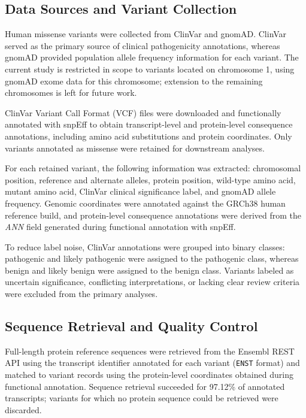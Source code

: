 \documentclass[12pt]{article}
\begin{document}
\subsection{Data Sources and Variant Collection}

Human missense variants were collected from ClinVar and gnomAD. ClinVar served as the primary source of clinical pathogenicity annotations, whereas gnomAD provided population allele frequency information for each variant. The current study is restricted in scope to variants located on chromosome 1, using gnomAD exome data for this chromosome; extension to the remaining chromosomes is left for future work.

ClinVar Variant Call Format (VCF) files were downloaded and functionally annotated with snpEff \cite{snpEff} to obtain transcript-level and protein-level consequence annotations, including amino acid substitutions and protein coordinates. Only variants annotated as missense were retained for downstream analyses.

For each retained variant, the following information was extracted: chromosomal position, reference and alternate alleles, protein position, wild-type amino acid, mutant amino acid, ClinVar clinical significance label, and gnomAD allele frequency. Genomic coordinates were annotated against the GRCh38 \cite{grch38} human reference build, and protein-level consequence annotations were derived from the \textit{ANN} field generated during functional annotation with snpEff.

To reduce label noise, ClinVar annotations were grouped into binary classes: pathogenic and likely pathogenic were assigned to the pathogenic class, whereas benign and likely benign were assigned to the benign class. Variants labeled as uncertain significance, conflicting interpretations, or lacking clear review criteria were excluded from the primary analyses.

\subsection{Sequence Retrieval and Quality Control}

Full-length protein reference sequences were retrieved from the Ensembl REST API \cite{ensembl} using the transcript identifier annotated for each variant (\texttt{ENST} format) and matched to variant records using the protein-level coordinates obtained during functional annotation. Sequence retrieval succeeded for 97.12\% of annotated transcripts; variants for which no protein sequence could be retrieved were discarded.
\end{document}
